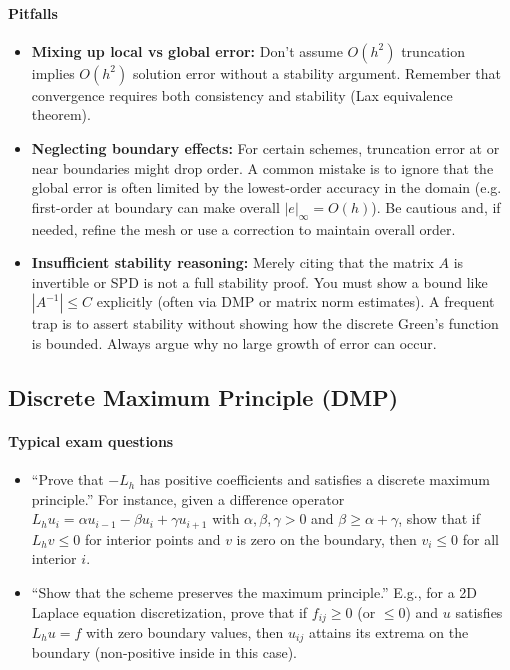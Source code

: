 \documentclass[a4paper,11pt]{article}
\begin{document}
\paragraph{Pitfalls}
\begin{itemize}
    \item \textbf{Mixing up local vs global error:} Don't assume $O(h^2)$ truncation implies $O(h^2)$ solution error without a stability argument. Remember that convergence requires both consistency and stability (Lax equivalence theorem).
    \item \textbf{Neglecting boundary effects:} For certain schemes, truncation error at or near boundaries might drop order. A common mistake is to ignore that the global error is often limited by the lowest-order accuracy in the domain (e.g. first-order at boundary can make overall $|e|_{\infty}=O(h)$). Be cautious and, if needed, refine the mesh or use a correction to maintain overall order.
    \item \textbf{Insufficient stability reasoning:} Merely citing that the matrix $A$ is invertible or SPD is not a full stability proof. You must show a bound like $|A^{-1}| \le C$ explicitly (often via DMP or matrix norm estimates). A frequent trap is to assert stability without showing how the discrete Green's function is bounded. Always argue why no large growth of error can occur.
\end{itemize}

\clearpage

\subsection{Discrete Maximum Principle (DMP)}
\paragraph{Typical exam questions}
\begin{itemize}
    \item \enquote{Prove that $-L_h$ has positive coefficients and satisfies a discrete maximum principle.} For instance, given a difference operator $L_h u_i = \alpha u_{i-1} - \beta u_i + \gamma u_{i+1}$ with $\alpha,\beta,\gamma>0$ and $\beta \ge \alpha+\gamma$, show that if $L_h v \le 0$ for interior points and $v$ is zero on the boundary, then $v_i \le 0$ for all interior $i$.
    \item \enquote{Show that the scheme preserves the maximum principle.} E.g., for a 2D Laplace equation discretization, prove that if $f_{ij}\ge0$ (or $\le0$) and $u$ satisfies $L_h u = f$ with zero boundary values, then $u_{ij}$ attains its extrema on the boundary (non-positive inside in this case).
\end{itemize}
\end{document}
